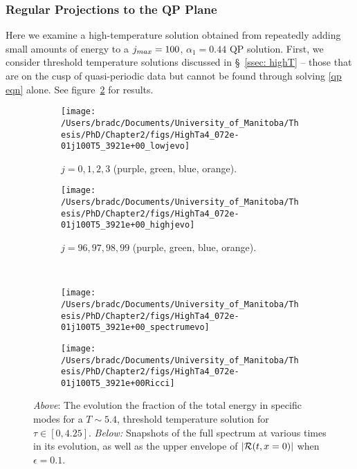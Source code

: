 \documentclass[../PhD.tex]{subfiles}
\begin{document}

\subsubsection{Regular Projections to the QP Plane}
\label{sssec: evo of regular projections}

Here we examine a high-temperature solution obtained from repeatedly adding small amounts of energy to a $j_{max} = 100$, $\alpha_1 = 0.44$ QP solution. First, we consider threshold temperature solutions discussed in \S~\!\ref{ssec: highT} -- those that are on the cusp of quasi-periodic data but cannot be found through solving \eqref{qp eqn} alone. See figure~\ref{fig:HighTa4_072e-01j100T5_3921e+00_evo} for results.

\begin{figure}[h]
	\centering
	\begin{subfigure}[t]{0.48\textwidth}
		\texttt{[image: /Users/bradc/Documents/University\_of\_Manitoba/Thesis/PhD/Chapter2/figs/HighTa4\_072e-01j100T5\_3921e+00\_lowjevo]}
		\caption{$j = 0, 1, 2, 3$ (purple, green, blue, orange).}
	\end{subfigure}
	\;
	\begin{subfigure}[t]{0.48\textwidth}
		\texttt{[image: /Users/bradc/Documents/University\_of\_Manitoba/Thesis/PhD/Chapter2/figs/HighTa4\_072e-01j100T5\_3921e+00\_highjevo]}
		\caption{$j=96, 97, 98, 99$ (purple, green, blue, orange).}
		\label{fig: HighTa4_072e-01j100T5_3921e+00_highjevo}
	\end{subfigure}
	\\
	\begin{subfigure}[t]{0.48\textwidth}
		\texttt{[image: /Users/bradc/Documents/University\_of\_Manitoba/Thesis/PhD/Chapter2/figs/HighTa4\_072e-01j100T5\_3921e+00\_spectrumevo]}
	\end{subfigure}
	\quad
	\begin{subfigure}[t]{0.48\textwidth}
		\texttt{[image: /Users/bradc/Documents/University\_of\_Manitoba/Thesis/PhD/Chapter2/figs/HighTa4\_072e-01j100T5\_3921e+00Ricci]}
	\end{subfigure}
	\caption{{\it Above}: The evolution the fraction of the total energy in specific modes for a $T \sim 5.4$, threshold temperature solution for $\tau \in [0, 4.25]$. {\it Below:} Snapshots of the full spectrum at various times in its evolution, as well as the upper envelope of $| \mathcal R(t,x=0)|$ when $\epsilon = 0.1$.}
	\label{fig:HighTa4_072e-01j100T5_3921e+00_evo}
\end{figure}
\end{document}
